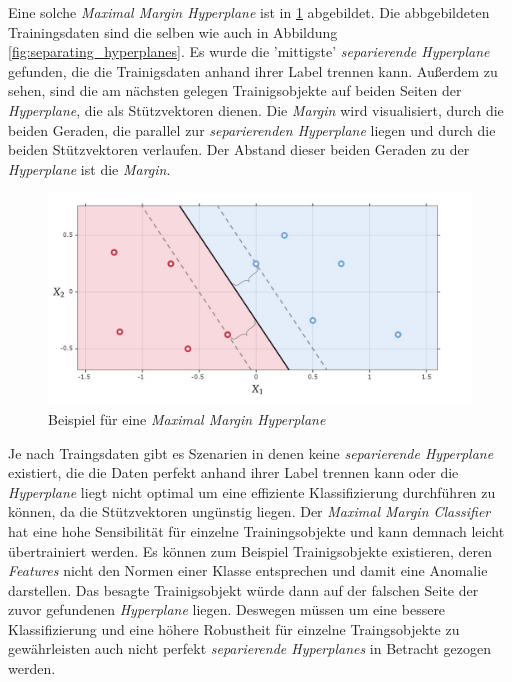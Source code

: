 Eine solche \textit{Maximal Margin Hyperplane} ist in \ref{fig:maximal_margin} abgebildet. Die abbgebildeten Trainingsdaten sind die selben
wie auch in Abbildung \ref{fig:separating_hyperplanes}. Es wurde die 'mittigste' \textit{separierende Hyperplane} gefunden, die die Trainigsdaten
anhand ihrer Label trennen kann. Außerdem zu sehen, sind die am nächsten gelegen Trainigsobjekte auf beiden Seiten der \textit{Hyperplane}, die als
Stützvektoren dienen. Die \textit{Margin} wird visualisiert, durch die beiden Geraden, die parallel zur \textit{separierenden Hyperplane} liegen und
durch die beiden Stützvektoren verlaufen. Der Abstand dieser beiden Geraden zu der \textit{Hyperplane} ist die \textit{Margin}.
\begin{figure}[H]
	\centering
	\includegraphics[width=\imgMed]{images/theory/maximal_margin.jpg}
	\caption{Beispiel für eine \textit{Maximal Margin Hyperplane}} 
	\label{fig:maximal_margin}
\end{figure}
Je nach Traingsdaten gibt es Szenarien in denen keine \textit{separierende Hyperplane} existiert, die die Daten perfekt anhand ihrer Label
trennen kann oder die \textit{Hyperplane} liegt nicht optimal um eine effiziente Klassifizierung durchführen zu können, da die
Stützvektoren ungünstig liegen. Der \textit{Maximal Margin Classifier} hat eine hohe Sensibilität für einzelne Trainingsobjekte
und kann demnach leicht übertrainiert werden. Es können zum Beispiel Trainigsobjekte existieren, deren \textit{Features} nicht den Normen einer Klasse entsprechen 
und damit eine Anomalie darstellen. Das besagte Trainigsobjekt würde dann auf der falschen Seite der zuvor gefundenen \textit{Hyperplane} liegen.
Deswegen müssen um eine bessere Klassifizierung und eine höhere Robustheit für einzelne Traingsobjekte
zu gewährleisten auch nicht perfekt \textit{separierende Hyperplanes} in Betracht gezogen werden.\cite[S. 343 - 345]{james_2013}


